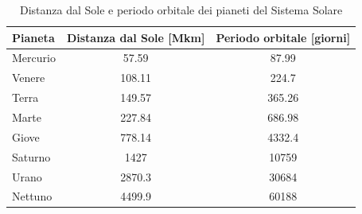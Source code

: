 \documentclass[letterpaper, 12pt]{article}
\numberwithin{equation}{section}    %
\begin{document}
\begin{table}[!ht]
    \centering
    \caption{Distanza dal Sole e periodo orbitale dei pianeti del Sistema Solare}
    \label{tab:pianeti}
        \begin{tabular}{|l|c|c|}
        \hline
        \textbf{Pianeta} & \textbf{Distanza dal Sole [Mkm]} & \textbf{Periodo orbitale [giorni]} \\
        \hline
        Mercurio & 57.59   & 87.99   \\
        Venere   & 108.11  & 224.7   \\
        Terra    & 149.57  & 365.26  \\
        Marte    & 227.84  & 686.98  \\
        Giove    & 778.14  & 4332.4  \\
        Saturno  & 1427    & 10759   \\
        Urano    & 2870.3  & 30684   \\
        Nettuno  & 4499.9  & 60188   \\
        \hline
        \end{tabular}
\end{table}
\end{document}

